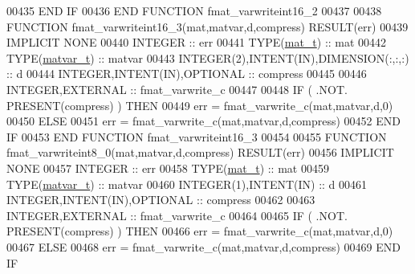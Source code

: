 \begin{DoxyCode}
00435 \textcolor{keywordflow}{    END IF}
00436 \textcolor{keyword}{END FUNCTION }fmat\_varwriteint16\_2
00437 
00438 \textcolor{keyword}{FUNCTION }fmat\_varwriteint16\_3(mat,matvar,d,compress) \textcolor{keyword}{RESULT}(err)
00439 \textcolor{keywordtype}{IMPLICIT NONE}
00440     \textcolor{keywordtype}{INTEGER}                                  :: err
00441     \textcolor{keywordtype}{TYPE}(\hyperlink{group___m_a_t_gab0fc888f5a5d79943b16284b1f91c2e8}{mat\_t})                              :: mat
00442     \textcolor{keywordtype}{TYPE}(\hyperlink{group___m_a_t_structmatvar__t}{matvar\_t})                           :: matvar
00443     \textcolor{keywordtype}{INTEGER(2)},\textcolor{keywordtype}{INTENT(IN)},\textcolor{keywordtype}{DIMENSION(:,:,:)}   :: d
00444     \textcolor{keywordtype}{INTEGER},\textcolor{keywordtype}{INTENT(IN)},\textcolor{keywordtype}{OPTIONAL}              :: compress
00445 
00446     \textcolor{keywordtype}{INTEGER},\textcolor{keywordtype}{EXTERNAL}                         :: fmat\_varwrite\_c
00447 
00448     \textcolor{keywordflow}{IF} ( .NOT. \textcolor{keyword}{PRESENT}(compress) ) \textcolor{keywordflow}{THEN}
00449         err = fmat\_varwrite\_c(mat,matvar,d,0)
00450     \textcolor{keywordflow}{ELSE}
00451         err = fmat\_varwrite\_c(mat,matvar,d,compress)
00452 \textcolor{keywordflow}{    END IF}
00453 \textcolor{keyword}{END FUNCTION }fmat\_varwriteint16\_3
00454 
00455 \textcolor{keyword}{FUNCTION }fmat\_varwriteint8\_0(mat,matvar,d,compress) \textcolor{keyword}{RESULT}(err)
00456 \textcolor{keywordtype}{IMPLICIT NONE}
00457     \textcolor{keywordtype}{INTEGER}                                  :: err
00458     \textcolor{keywordtype}{TYPE}(\hyperlink{group___m_a_t_gab0fc888f5a5d79943b16284b1f91c2e8}{mat\_t})                              :: mat
00459     \textcolor{keywordtype}{TYPE}(\hyperlink{group___m_a_t_structmatvar__t}{matvar\_t})                           :: matvar
00460     \textcolor{keywordtype}{INTEGER(1)},\textcolor{keywordtype}{INTENT(IN)}                    :: d
00461     \textcolor{keywordtype}{INTEGER},\textcolor{keywordtype}{INTENT(IN)},\textcolor{keywordtype}{OPTIONAL}              :: compress
00462 
00463     \textcolor{keywordtype}{INTEGER},\textcolor{keywordtype}{EXTERNAL}                         :: fmat\_varwrite\_c
00464 
00465     \textcolor{keywordflow}{IF} ( .NOT. \textcolor{keyword}{PRESENT}(compress) ) \textcolor{keywordflow}{THEN}
00466         err = fmat\_varwrite\_c(mat,matvar,d,0)
00467     \textcolor{keywordflow}{ELSE}
00468         err = fmat\_varwrite\_c(mat,matvar,d,compress)
00469 \textcolor{keywordflow}{    END IF}

\end{DoxyCode}
